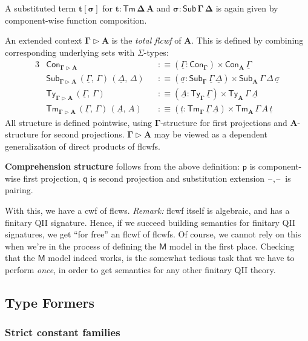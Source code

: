 \documentclass[12pt,a4paper,twoside,openany]{book}
\theoremstyle{remark}
\theoremstyle{definition}
\theoremstyle{theorem}
\newcommand{\bs}[1]{\boldsymbol{#1}}
\newcommand{\Con}{\mathsf{Con}}
\newcommand{\Sub}{\mathsf{Sub}}
\newcommand{\Tm}{\mathsf{Tm}}
\newcommand{\Ty}{\mathsf{Ty}}
\newcommand{\blank}{\mathord{\hspace{1pt}\text{--}\hspace{1pt}}}
\newcommand{\ext}{\triangleright}
\newcommand{\p}{\mathsf{p}}
\newcommand{\q}{\mathsf{q}}
\newcommand{\bGamma}{\bs{\Gamma}}
\newcommand{\bA}{\bs{A}}
\newcommand{\bM}{\bs{\mathsf{M}}}
\newcommand{\ul}[1]{\underline{#1}}
\newcommand{\ulGamma}{\ul{\Gamma}}
\newcommand{\ulDelta}{\ul{\Delta}}
\newcommand{\ulsigma}{\ul{\sigma}}
\newcommand{\ult}{\ul{t}}
\newcommand{\ulA}{\ul{A}}
\newcommand{\defn}{:\equiv}
\begin{document}
A substituted term $\bs{t[\sigma]}$ for $\bs{t : \Tm\,\Delta\,A}$ and
$\bs{\sigma : \Sub\,\Gamma\,\Delta}$ is again given by component-wise function
composition.

An extended context $\bs{\Gamma \ext A}$ is the \emph{total flcwf} of
$\bA$. This is defined by combining corresponding underlying sets with
$\Sigma$-types:
\begin{alignat*}{3}
  & \Con_{\bs{\Gamma \ext A}} &&\defn (\ulGamma : \Con_{\bGamma}) \times \Con_{\bA}\,\ulGamma\\
  & \Sub_{\bs{\Gamma \ext A}}\,(\ulGamma,\,\Gamma)\,(\ulDelta,\,\Delta) &&\defn (\ulsigma : \Sub_{\bGamma}\,\ulGamma\,\ulDelta) \times \Sub_{\bA}\,\Gamma\,\Delta\,\ulsigma\\
  & \Ty_{\bs{\Gamma \ext A}}\,(\ulGamma,\,\Gamma) &&\defn (\ulA : \Ty_{\bGamma}\,\ulGamma) \times \Ty_{\bA}\,\Gamma\,\ulA\\
  & \Tm_{\bs{\Gamma \ext A}}\,(\ulGamma,\,\Gamma)\,(\ulA,\,A) &&\defn (\ult : \Tm_{\bGamma}\,\ulGamma\,\ulA) \times \Tm_{\bA}\,\Gamma\,A\,\ult
\end{alignat*}
All structure is defined pointwise, using $\bGamma$-structure for first
projections and $\bA$-structure for second projections. $\bs{\Gamma \ext A}$ may
be viewed as a dependent generalization of direct products of flcwfs.

\textbf{Comprehension structure} follows from the above definition: $\bs{\p}$ is
component-wise first projection, $\bs{\q}$ is second projection and substitution
extension $\bs{\blank,\blank}$ is pairing.

With this, we have a cwf of flcws. \emph{Remark:} flcwf itself is algebraic, and
has a finitary QII signature. Hence, if we succeed building semantics for
finitary QII signatures, we get ``for free'' an flcwf of flcwfs. Of course, we
cannot rely on this when we're in the process of defining the $\bM$ model in the
first place. Checking that the $\bM$ model indeed works, is the somewhat tedious
task that we have to perform \emph{once}, in order to get semantics for any
other finitary QII theory.

\subsection{Type Formers}

\subsubsection{Strict constant families}
\end{document}
